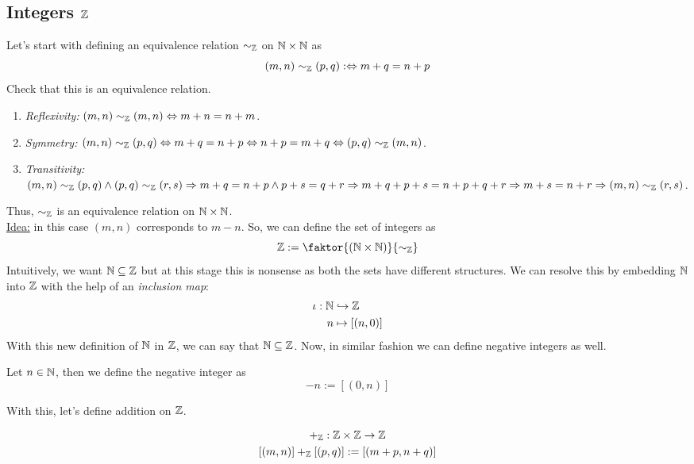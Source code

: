 \subsection[Integers]{Integers \(\Z\)}
Let's start with defining an equivalence relation \(\sim_{\mathbb Z}\) on \(\mathbb N \times \mathbb N\) as
\begin{equation}
	(m, n) \sim_{\mathbb Z} (p, q) :\Leftrightarrow m + q = n + p
\end{equation}
Check that this is an equivalence relation.
\begin{enumerate}
	\item \emph{Reflexivity:} \((m, n) \sim_{\mathbb Z} (m, n) \Leftrightarrow m + n = n + m\).
	\item \emph{Symmetry:} \((m, n) \sim_{\mathbb Z} (p, q) \Leftrightarrow m + q = n + p \Leftrightarrow n + p = m + q \Leftrightarrow (p, q) \sim_{\mathbb Z} (m, n)\).
	\item \emph{Transitivity:} \((m, n) \sim_{\mathbb Z} (p, q) \land (p, q) \sim_{\mathbb Z} (r, s) \Rightarrow m + q = n + p \land p + s = q + r \Rightarrow m + q + p + s = n + p + q + r \Rightarrow m + s = n + r \Rightarrow (m, n) \sim_{\mathbb Z} (r, s)\).
\end{enumerate}
Thus, \(\sim_{\mathbb Z}\) is an equivalence relation on \(\mathbb N \times \mathbb N\).\\
\uline{Idea:} in this case \((m, n)\) corresponds to \(m - n\). So, we can define the set of integers as
\begin{equation}
	\Z := \faktor{(\N \times \N)}{\sim_{\Z}}
\end{equation}
Intuitively, we want \(\mathbb N \subseteq \mathbb Z\) but at this stage this is nonsense as both the sets have different structures. We can resolve this by embedding \(\mathbb N\) into \(\Z\) with the help of an \emph{inclusion map}:
\begin{equation}
	\begin{aligned}
		\iota: \mathbb N & \hookrightarrow \mathbb Z         \\
		n         & \mapsto [(n, 0)]
	\end{aligned}
\end{equation}
With this new definition of \(\mathbb N\) in \(\Z\), we can say that \(\mathbb N \subseteq \mathbb Z\). Now, in similar fashion we can define negative integers as well.
\begin{definition}
	Let \(n \in \mathbb N\), then we define the negative integer as
	\begin{equation}
		-n := [(0, n)]
	\end{equation}
\end{definition}
With this, let's define addition on \(\Z\).
\begin{definition}[Addition on \(\Z\)]
	\begin{equation}
		\begin{gathered}
			+_{\mathbb Z}: \mathbb Z \times \mathbb Z \to \mathbb Z \\
			[(m, n)] +_{\mathbb Z} [(p, q)] := [(m + p, n + q)]
		\end{gathered}
	\end{equation}
\end{definition}
